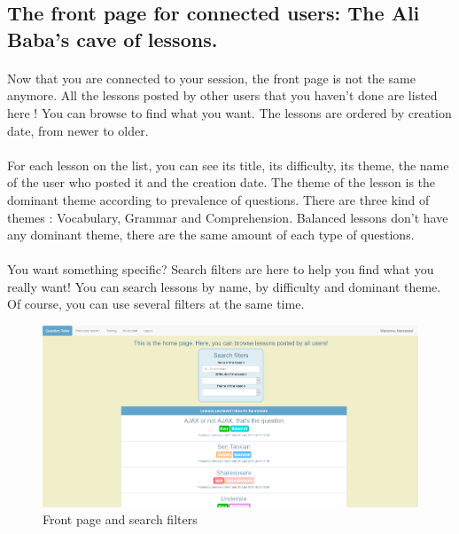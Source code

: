 \subsection{The front page for connected users: The Ali Baba's cave of lessons.}

\paragraph{}
Now that you are connected to your session, the front page is not the same anymore. All the lessons posted by other users that you haven't done are listed here ! You can browse to find what you want. The lessons are ordered by creation date, from newer to older. 

\paragraph{}
For each lesson on the list, you can see its title, its difficulty, its theme, the name of the user who posted it and the creation date. The theme of the lesson is the dominant theme according to prevalence of questions. There are three kind of themes : Vocabulary, Grammar and Comprehension. Balanced lessons don't have any dominant theme, there are the same amount of each type of questions.

\paragraph{}
You want something specific? Search filters are here to help you find what you really want! You can search lessons by name, by difficulty and dominant theme. Of course, you can use several filters at the same time.

\begin{figure}[H]
    \includegraphics[width=1\textwidth]{./images/snapshot1.png}
    \caption{Front page and search filters}
\end{figure}

